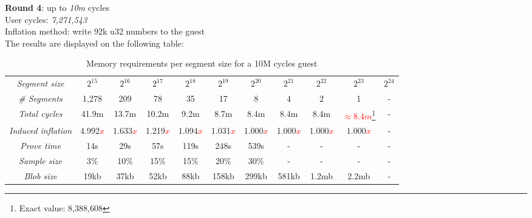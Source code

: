 \documentclass[a4paper, 10pt]{article}
\begin{document}
\par \noindent
\textbf{Round 4}: up to \textit{10m} cycles\\
User cycles: \textit{7,271,543}\\
Inflation method: write 92k u32 numbers to the guest\\
The results are displayed on the following table:
\begin{table}[H]
  	\begin{center}
    \label{tab:table5}
    \begin{minipage}{\textwidth}
    \begin{adjustbox}{width=\textwidth}
    \begin{tabular}{c|c|c|c|c|c|c|c|c|c|c}
	  \textit{Segment size} & $2^{15}$ & $2^{16}$ & $2^{17}$ & $2^{18}$ & $2^{19}$ & $2^{20}$ & $2^{21}$ & $2^{22}$ & $2^{23}$ & $2^{24}$\\
	  \textit{\# Segments} & 1,278 & 209 & 78 & 35 & 17 & 8 & 4 & 2 & 1 & -\\
	  \textit{Total cycles} & 41.9m & 13.7m & 10.2m & 9.2m & 8.7m & 8.4m & 8.4m & 8.4m & \textcolor{red}{$\approx 8.4m$}\footnote{Exact value: 8,388,608} & -\\
	  \textit{Induced inflation} & 4.992\textcolor{red}{$x$} & 1.633\textcolor{red}{$x$} & 1.219\textcolor{red}{$x$} & 1.094\textcolor{red}{$x$} & 1.031\textcolor{red}{$x$} & 1.000\textcolor{red}{$x$} & 1.000\textcolor{red}{$x$} & 1.000\textcolor{red}{$x$} & 1.000\textcolor{red}{$x$} & -\\
	  \textit{Prove time} & 14s & 29s & 57s & 119s & 248s & 539s & - & - & - & -\\
	  \textit{Sample size} & 3\% & 10\% & 15\% & 15\% & 20\% & 30\% & - & - & - & -\\
	  \textit{Blob size} & 19kb & 37kb & 52kb & 88kb &158kb & 299kb & 581kb & 1.2mb & 2.2mb & -\\
   	\end{tabular}
   	\end{adjustbox}
   	\end{minipage}
    \caption{Memory requirements per segment size for a 10M cycles guest}
  \end{center}
\end{table}
\end{document}
